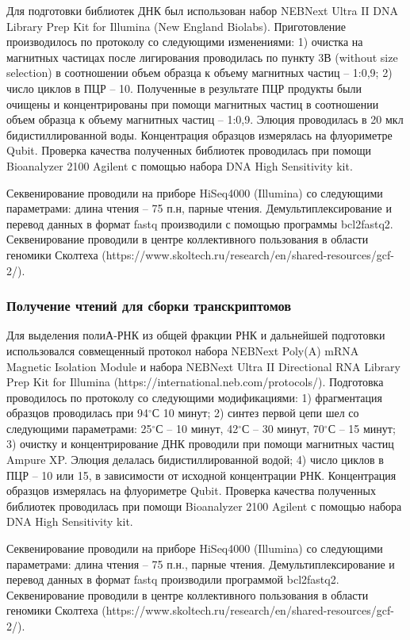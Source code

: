 Для подготовки библиотек ДНК был использован набор NEBNext Ultra II DNA Library Prep Kit for Illumina (New England Biolabs). Приготовление производилось по протоколу со следующими изменениями: 1)  очистка на магнитных частицах после лигирования проводилась по пункту 3В (without size selection) в соотношении объем образца к объему магнитных частиц -- 1:0,9; 2) число циклов в ПЦР -- 10.
Полученные в результате ПЦР продукты были очищены и концентрированы при помощи магнитных частиц в соотношении объем образца к объему магнитных частиц -- 1:0,9. Элюция проводилась в 20 мкл бидистиллированной воды. Концентрация образцов измерялась на флуориметре Qubit.
Проверка качества полученных библиотек проводилась при помощи Bioanalyzer 2100 Agilent с помощью набора DNA High Sensitivity kit.

Секвенирование проводили на приборе HiSeq4000 (Illumina) со следующими параметрами: длина чтения -- 75 п.н, парные чтения. Демультиплексирование и перевод данных в формат fastq производили с помощью программы bcl2fastq2. Секвенирование проводили в центре коллективного пользования в области геномики Сколтеха (https://www.skoltech.ru/research/en/shared-resources/gcf-2/).


\subsubsection{Получение чтений для сборки транскриптомов}

Для выделения полиА-РНК из общей фракции РНК и дальнейшей подготовки использовался совмещенный протокол набора NEBNext Poly(A) mRNA Magnetic Isolation Module и набора NEBNext Ultra II Directional RNA Library Prep Kit for Illumina (https://international.neb.com/protocols/). Подготовка проводилось по протоколу со следующими модификациями: 
1) фрагментация образцов проводилась при 94$^\circ$С 10 минут; 
2) синтез первой цепи шел со следующими параметрами: 25$^\circ$С -- 10 минут, 42$^\circ$С -- 30 минут, 70$^\circ$С -- 15 минут; 
3) очистку и концентрирование ДНК проводили при помощи магнитных частиц Ampure XP. Элюция делалась бидистиллированной водой; 
4) число циклов в ПЦР -- 10 или 15, в зависимости от исходной концентрации РНК. 
Концентрация образцов измерялась на флуориметре Qubit. Проверка качества полученных библиотек проводилась при помощи Bioanalyzer 2100 Agilent с помощью набора DNA High Sensitivity kit. 

Секвенирование проводили на приборе HiSeq4000 (Illumina) со следующими параметрами: длина чтения -- 75 п.н., парные чтения. Демультиплексирование и перевод данных в формат fastq производили программой bcl2fastq2. Секвенирование проводили в центре коллективного пользования в области геномики Сколтеха (https://www.skoltech.ru/research/en/shared-resources/gcf-2/).

